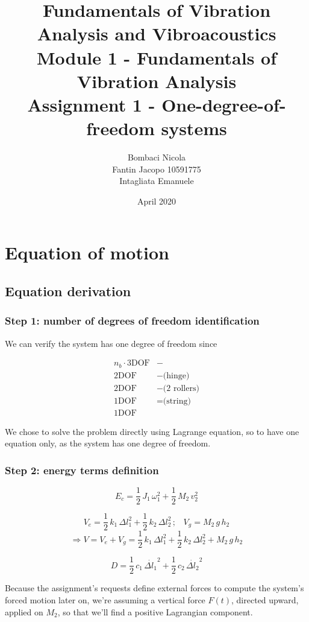 \documentclass[a4paper,12pt,oneside]{article}
\title{Fundamentals of Vibration Analysis and Vibroacoustics \\
Module 1 - Fundamentals of Vibration Analysis \\
Assignment 1 - One-degree-of-freedom systems}
\author{Bombaci Nicola \\
Fantin Jacopo 10591775 \\
Intagliata Emanuele}
\date{April 2020}
\begin{document}
\maketitle

\section{Equation of motion}

\subsection{Equation derivation}

\subsubsection*{Step 1: number of degrees of freedom identification}

We can verify the system has one degree of freedom since

\[ \begin{split}
n_b \cdot 3 \text{DOF} & - \\
2 \text{DOF} & - \text{(hinge)} \\
2 \text{DOF}  & - \text{(2 rollers)} \\
1 \text{DOF} & = \text{(string)} \\
1 \text{DOF}
\end{split} \]

We chose to solve the problem directly using Lagrange equation, so to have one equation only, as the system has one degree of freedom.

\subsubsection*{Step 2: energy terms definition}

\[ E_c = \frac{1}{2} \, J_1 \, \omega_1^2 + \frac{1}{2} \, M_2 \, v_2^2 \]

\[
V_e = \frac{1}{2} \, k_1 \, \Delta l_1^2 + \frac{1}{2} \, k_2 \, \Delta l_2^2 \, \text{;} %
\quad V_g = M_2 \, g \, h_2
\]
\[
\Rightarrow V = V_e + V_g = \frac{1}{2} \, k_1 \, \Delta l_1^2 + \frac{1}{2} \, k_2 \, \Delta l_2^2 + %
M_2 \, g \, h_2
\]

\[ D = \frac{1}{2} \, c_1 \, \dot{\Delta l_1}^2 + \frac{1}{2} \, c_2 \, \dot{\Delta l_2}^2 \]

Because the assignment's requests define external forces to compute the system's forced motion later on, we're assuming a vertical force $ F(t) $, directed upward, applied on $ M_2 $, so that we'll find a positive Lagrangian component.
\end{document}
